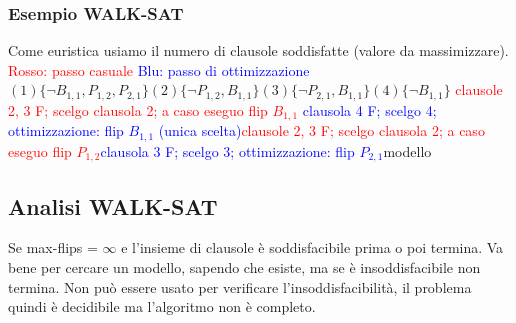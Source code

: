 \documentclass{article}
\begin{document}
\subsubsection{Esempio WALK-SAT}
Come euristica usiamo il numero di clausole soddisfatte (valore da massimizzare). \newline
\textcolor{red}{Rosso: passo casuale} \newline
\textcolor{blue}{Blu: passo di ottimizzazione} \newline
$(1)\{\neg B_{1,1}, P_{1,2}, P_{2,1}\} (2)\{\neg P_{1,2}, B_{1,1}\} (3)\{\neg P_{2,1}, B_{1,1}\} (4)\{\neg B_{1,1}\}$ \newline
[$B_{1,1}=F, P_{1,2}=T, P_{2,1}=T$] \textcolor{red}{clausole 2, 3 F; scelgo clausola 2; a caso eseguo flip $B_{1,1}$} \newline
[$B_{1,1}=T, P_{1,2}=T, P_{2,1}=T$] \textcolor{blue}{clausola 4 F; scelgo 4; ottimizzazione: flip $B_{1,1}$ (unica scelta)}\newline
[$B_{1,1}=F, P_{1,2}=T, P_{2,1}=T$] \textcolor{red}{clausole 2, 3 F; scelgo clausola 2; a caso eseguo flip $P_{1,2}$}\newline
[$B_{1,1}=F, P_{1,2}=F, P_{2,1}=T$] \textcolor{blue}{clausola 3 F; scelgo 3; ottimizzazione: flip $P_{2,1}$}\newline
[$B_{1,1}=F, P_{1,2}=F, P_{2,1}=F$]   modello\newline
\subsection{Analisi WALK-SAT}
Se max-flips = $\infty$ e l’insieme di clausole è soddisfacibile prima o poi termina. Va bene per cercare un modello, sapendo che esiste, ma se è insoddisfacibile non termina. Non può essere usato per verificare l’insoddisfacibilità, il problema quindi è decidibile ma l’algoritmo non è completo. \newline
\end{document}
